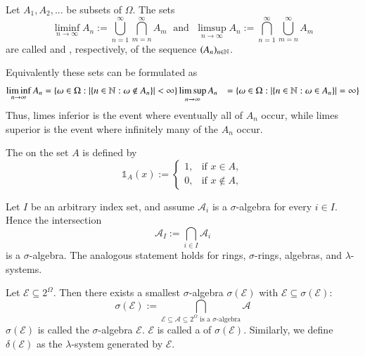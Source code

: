 \documentclass[12pt, a4paper, oneside, openright, titlepage]{book}
\begin{document}
\begin{defn}
    Let $A_1,A_2,...$ be subsets of $\Omega$. The sets \begin{equation*}
        \liminf_{n\rightarrow \infty}A_n := \bigcup_{n=1}^{\infty}\bigcap_{m=n}^{\infty}A_m\;\text{ and }\;\limsup_{n\rightarrow \infty}A_n := \bigcap_{n=1}^{\infty}\bigcup_{m=n}^{\infty}A_m
    \end{equation*}
    are called  and , respectively, of the sequence $(A_n)_{n\in\mathbb N}$.
\end{defn}

Equivalently these sets can be formulated as \begin{align*}
    \liminf_{n\rightarrow\infty}A_n &= \{\omega \in \Omega: |\{n \in \mathbb N:\omega \notin A_n\}| < \infty\}
    \limsup_{n\rightarrow \infty}A_n &= \{\omega \in \Omega: |\{n\in\mathbb N: \omega \in A_n\}| = \infty\}
\end{align*}
Thus, limes inferior is the event where eventually all of $A_n$ occur, while limes superior is the event where infinitely many of the $A_n$ occur.

\begin{defn}
    The  on the set $A$ is defined by \begin{equation*}
        \mathbb{1}_A(x) := \left\{\begin{array}{lc} 1, & \text{if } x \in A, \\ 0, & \text{if } x \notin A, \end{array}\right.
    \end{equation*}
\end{defn}

\begin{thm}
    Let $I$ be an arbitrary index set, and assume $\mathcal{A}_i$ is a $\sigma$-algebra for every $i \in I$. Hence the intersection \begin{equation*}
        \mathcal{A}_I := \bigcap_{i\in I}\mathcal{A}_i
    \end{equation*}
    is a $\sigma$-algebra. The analogous statement holds for rings, $\sigma$-rings, algebras, and $\lambda$-systems.
\end{thm}

\begin{thm}
    Let $\mathcal{E} \subseteq 2^{\Omega}$. Then there exists a smallest $\sigma$-algebra $\sigma(\mathcal{E})$ with $\mathcal{E} \subseteq \sigma(\mathcal{E})$: \begin{equation*}
        \sigma(\mathcal{E}) := \bigcap_{\mathcal{E}\subseteq \mathcal{A}\subseteq 2^{\Omega}\text{ is a $\sigma$-algebra}}\mathcal{A}
    \end{equation*}
    $\sigma(\mathcal{E})$ is called the $\sigma$-algebra  $\mathcal{E}$. $\mathcal{E}$ is called a  of $\sigma(\mathcal{E})$. Similarly, we define $\delta(\mathcal{E})$ as the $\lambda$-system generated by $\mathcal{E}$.
\end{thm}
\end{document}
